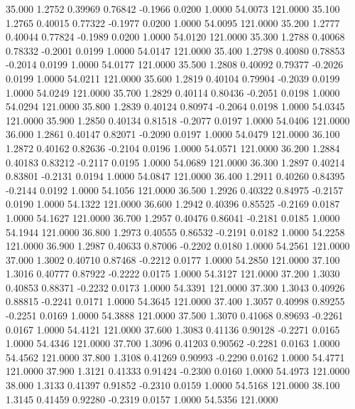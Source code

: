   35.000   1.2752   0.39969   0.76842  -0.1966   0.0200   1.0000  54.0073 121.0000
  35.100   1.2765   0.40015   0.77322  -0.1977   0.0200   1.0000  54.0095 121.0000
  35.200   1.2777   0.40044   0.77824  -0.1989   0.0200   1.0000  54.0120 121.0000
  35.300   1.2788   0.40068   0.78332  -0.2001   0.0199   1.0000  54.0147 121.0000
  35.400   1.2798   0.40080   0.78853  -0.2014   0.0199   1.0000  54.0177 121.0000
  35.500   1.2808   0.40092   0.79377  -0.2026   0.0199   1.0000  54.0211 121.0000
  35.600   1.2819   0.40104   0.79904  -0.2039   0.0199   1.0000  54.0249 121.0000
  35.700   1.2829   0.40114   0.80436  -0.2051   0.0198   1.0000  54.0294 121.0000
  35.800   1.2839   0.40124   0.80974  -0.2064   0.0198   1.0000  54.0345 121.0000
  35.900   1.2850   0.40134   0.81518  -0.2077   0.0197   1.0000  54.0406 121.0000
  36.000   1.2861   0.40147   0.82071  -0.2090   0.0197   1.0000  54.0479 121.0000
  36.100   1.2872   0.40162   0.82636  -0.2104   0.0196   1.0000  54.0571 121.0000
  36.200   1.2884   0.40183   0.83212  -0.2117   0.0195   1.0000  54.0689 121.0000
  36.300   1.2897   0.40214   0.83801  -0.2131   0.0194   1.0000  54.0847 121.0000
  36.400   1.2911   0.40260   0.84395  -0.2144   0.0192   1.0000  54.1056 121.0000
  36.500   1.2926   0.40322   0.84975  -0.2157   0.0190   1.0000  54.1322 121.0000
  36.600   1.2942   0.40396   0.85525  -0.2169   0.0187   1.0000  54.1627 121.0000
  36.700   1.2957   0.40476   0.86041  -0.2181   0.0185   1.0000  54.1944 121.0000
  36.800   1.2973   0.40555   0.86532  -0.2191   0.0182   1.0000  54.2258 121.0000
  36.900   1.2987   0.40633   0.87006  -0.2202   0.0180   1.0000  54.2561 121.0000
  37.000   1.3002   0.40710   0.87468  -0.2212   0.0177   1.0000  54.2850 121.0000
  37.100   1.3016   0.40777   0.87922  -0.2222   0.0175   1.0000  54.3127 121.0000
  37.200   1.3030   0.40853   0.88371  -0.2232   0.0173   1.0000  54.3391 121.0000
  37.300   1.3043   0.40926   0.88815  -0.2241   0.0171   1.0000  54.3645 121.0000
  37.400   1.3057   0.40998   0.89255  -0.2251   0.0169   1.0000  54.3888 121.0000
  37.500   1.3070   0.41068   0.89693  -0.2261   0.0167   1.0000  54.4121 121.0000
  37.600   1.3083   0.41136   0.90128  -0.2271   0.0165   1.0000  54.4346 121.0000
  37.700   1.3096   0.41203   0.90562  -0.2281   0.0163   1.0000  54.4562 121.0000
  37.800   1.3108   0.41269   0.90993  -0.2290   0.0162   1.0000  54.4771 121.0000
  37.900   1.3121   0.41333   0.91424  -0.2300   0.0160   1.0000  54.4973 121.0000
  38.000   1.3133   0.41397   0.91852  -0.2310   0.0159   1.0000  54.5168 121.0000
  38.100   1.3145   0.41459   0.92280  -0.2319   0.0157   1.0000  54.5356 121.0000
